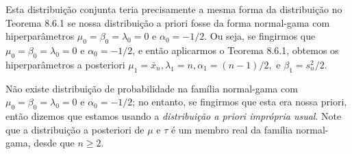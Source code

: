 Esta distribuição conjunta teria precisamente a mesma forma da distribuição no Teorema 8.6.1 se nossa distribuição a priori fosse da forma normal-gama com hiperparâmetros $\mu_0 = \beta_0 = \lambda_0 = 0$ e $\alpha_0 = -1/2$. Ou seja, se fingirmos que $\mu_0 = \beta_0 = \lambda_0 = 0$ e $\alpha_0 = -1/2$, e então aplicarmos o Teorema 8.6.1, obtemos os hiperparâmetros a posteriori $\mu_1 = \bar{x}_n, \lambda_1 = n, \alpha_1 = (n-1)/2,$ e $\beta_1 = s_n^2/2$.

Não existe distribuição de probabilidade na família normal-gama com $\mu_0 = \beta_0 = \lambda_0 = 0$ e $\alpha_0 = -1/2$; no entanto, se fingirmos que esta era nossa priori, então dizemos que estamos usando a \textit{distribuição a priori imprópria usual}. Note que a distribuição a posteriori de $\mu$ e $\tau$ é um membro real da família normal-gama, desde que $n \ge 2$.

